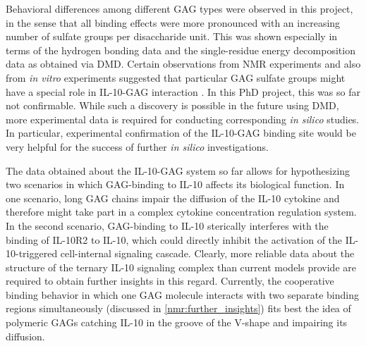 
Behavioral differences among different GAG types were observed in this project,
in the sense that all binding effects were more pronounced with an increasing
number of sulfate groups per disaccharide unit. This was shown especially in
terms of the hydrogen bonding data and the single-residue energy decomposition
data as obtained via DMD. Certain observations from NMR experiments and also
from \textit{in vitro} experiments suggested that particular GAG sulfate groups
might have a special role in IL-10-GAG interaction \cite{salek_ardakani_2000,
kuenze_gehrcke_2014}. In this PhD project, this was so far not confirmable.
While such a discovery is possible in the future using DMD, more experimental
data is required for conducting corresponding \textit{in silico} studies. In
particular, experimental confirmation of the IL-10-GAG binding site would be
very helpful for the success of further \textit{in silico} investigations.

The data obtained about the IL-10-GAG system so far allows for hypothesizing two
scenarios in which GAG-binding to IL-10 affects its biological function. In one
scenario, long GAG chains impair the diffusion of the IL-10 cytokine and
therefore might take part in a complex cytokine concentration regulation system.
In the second scenario, GAG-binding to IL-10 sterically interferes with the
binding of IL-10R2 to IL-10, which could directly inhibit the activation of the
IL-10-triggered cell-internal signaling cascade. Clearly, more reliable data
about the structure of the ternary IL-10 signaling complex than current models
provide are required to obtain further insights in this regard. Currently, the
cooperative binding behavior in which one GAG molecule interacts with two
separate binding regions simultaneously (discussed in
\cref{nmr:further_insights}) fits best the idea of polymeric GAGs catching IL-10
in the groove of the V-shape and impairing its diffusion.

